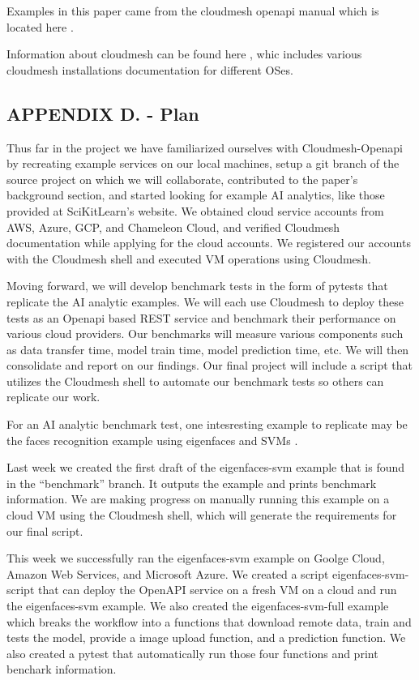 Examples in this paper came from the cloudmesh openapi manual which is
located here \cite{cloudmesh-openapi}.

Information about cloudmesh can be found here \cite{cloudmesh-manual},
whic includes various cloudmesh installations documentation for
different OSes.

\subsection{APPENDIX D. - Plan}\label{appendix-d.---plan}

Thus far in the project we have familiarized ourselves with
Cloudmesh-Openapi by recreating example services on our local machines,
setup a git branch of the source project on which we will collaborate,
contributed to the paper's background section, and started looking for
example AI analytics, like those provided at SciKitLearn's website. We
obtained cloud service accounts from AWS, Azure, GCP, and Chameleon
Cloud, and verified Cloudmesh documentation while applying for the cloud
accounts. We registered our accounts with the Cloudmesh shell and
executed VM operations using Cloudmesh.

Moving forward, we will develop benchmark tests in the form of pytests
that replicate the AI analytic examples. We will each use Cloudmesh to
deploy these tests as an Openapi based REST service and benchmark their
performance on various cloud providers. Our benchmarks will measure
various components such as data transfer time, model train time, model
prediction time, etc. We will then consolidate and report on our
findings. Our final project will include a script that utilizes the
Cloudmesh shell to automate our benchmark tests so others can replicate
our work.

For an AI analytic benchmark test, one intesresting example to replicate
may be the faces recognition example using eigenfaces and SVMs \cite{www-skikit-learn-faces}.

Last week we created the first draft of the eigenfaces-svm example that
is found in the ``benchmark'' branch. It outputs the example and prints
benchmark information. We are making progress on manually running this
example on a cloud VM using the Cloudmesh shell, which will generate the
requirements for our final script.

This week we successfully ran the eigenfaces-svm example on Goolge
Cloud, Amazon Web Services, and Microsoft Azure. We created a script
eigenfaces-svm-script that can deploy the OpenAPI service on a fresh VM
on a cloud and run the eigenfaces-svm example. We also created the
eigenfaces-svm-full example which breaks the workflow into a functions
that download remote data, train and tests the model, provide a image
upload function, and a prediction function. We also created a pytest
that automatically run those four functions and print benchark
information.

